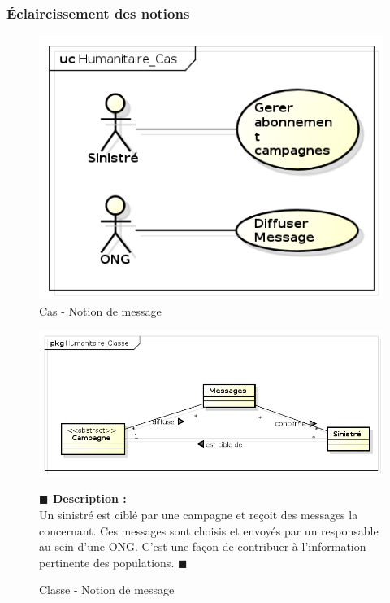 \documentclass[11pt, titlepage]{report}
\newcommand{\debutDescription}{\noindent\textbf{\textcolor{DescriptionColor}{$\blacksquare$  Description : \\}}}
\newcommand{\finDescription}{\noindent\textcolor{DescriptionColor}{$\blacksquare$}}
\begin{document}
\subsubsection{Éclaircissement des notions}
\begin{figure}[h!]
\begin{center}
\includegraphics[scale=.4]{../images/diagrammes/uml/exigence_5/cas_exigence_5.png} 
\caption{Cas - Notion de message}
\end{center}
\end{figure}

\begin{figure}[h!]
\begin{center}
\includegraphics[scale=.4]{../images/diagrammes/uml/exigence_5/classe_exigence_5.png} 
\caption{Classe - Notion de message}
\end{center}
\debutDescription
Un sinistré est ciblé par une campagne et reçoit des messages la concernant. Ces messages sont choisis et envoyés par un responsable au sein d'une ONG. C'est une façon de contribuer à l'information pertinente des populations.
\finDescription
\end{figure}
\end{document}

